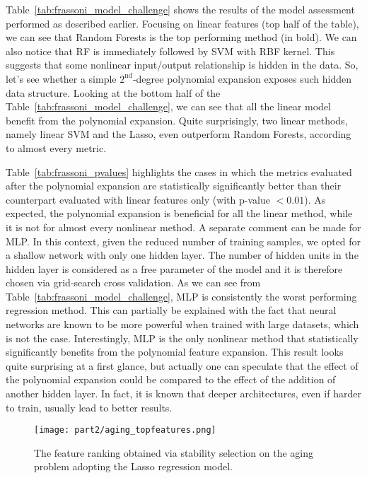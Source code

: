 


Table~\ref{tab:frassoni_model_challenge} shows the results of the model assessment performed as described earlier. Focusing on linear features (top half of the table), we can see that Random Forests is the top performing method (in bold). We can also notice that RF is immediately followed by SVM with RBF kernel. This suggests that some nonlinear input/output relationship is hidden in the data. So, let's see whether a simple $2^\text{nd}$-degree polynomial expansion exposes such hidden data structure.
Looking at the bottom half of the Table~\ref{tab:frassoni_model_challenge}, we can see that all the linear model benefit from the polynomial expansion. Quite surprisingly, two linear methods, namely linear SVM and the Lasso, even outperform Random Forests, according to almost every metric.

Table~\ref{tab:frassoni_pvalues} highlights the cases in which the metrics evaluated after the polynomial expansion are statistically significantly better than their counterpart evaluated with linear features only (with p-value $< 0.01$).
As expected, the polynomial expansion is beneficial for all the linear method, while it is not for almost every nonlinear method.
A separate comment can be made for MLP. In this context, given the reduced number of training samples, we opted for a shallow network with only one hidden layer. The number of hidden units in the hidden layer is considered as a free parameter of the model and it is therefore chosen via grid-search cross validation.
As we can see from Table~\ref{tab:frassoni_model_challenge}, MLP is consistently the worst performing regression method. This can partially be explained with the fact that neural networks are known to be more powerful when trained with large datasets, which is not the case. Interestingly, MLP is the only nonlinear method that statistically significantly benefits from the polynomial feature expansion.
This result looks quite surprising at a first glance, but actually one can speculate that the effect of the polynomial expansion could be compared to the effect of the addition of another hidden layer. In fact, it is known that deeper architectures, even if harder to train, usually lead to better results.

\begin{figure}[h!]
	\centering
	\texttt{[image: part2/aging\_topfeatures.png]}
	\caption{The feature ranking obtained via stability selection on the aging problem adopting the Lasso regression model.} \label{fig:frassoni_topfeat}
\end{figure}

